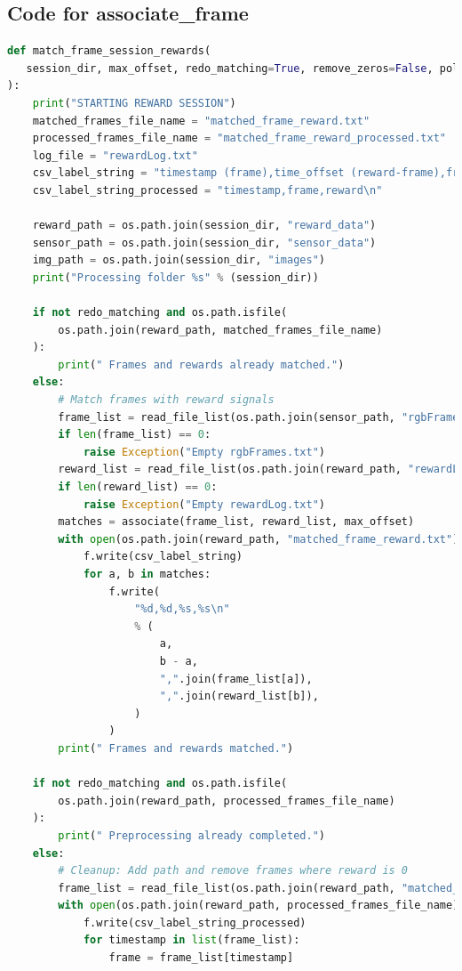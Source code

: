 \documentclass[12pt]{report}
\begin{document}
\subsection*{Code for associate\_frame}
\label{sub:associate}
\begin{lstlisting}[language=Python]
def match_frame_session_rewards(
   session_dir, max_offset, redo_matching=True, remove_zeros=False, policy="autopilot"
):
    print("STARTING REWARD SESSION")
    matched_frames_file_name = "matched_frame_reward.txt"
    processed_frames_file_name = "matched_frame_reward_processed.txt"
    log_file = "rewardLog.txt"
    csv_label_string = "timestamp (frame),time_offset (reward-frame),frame,reward\n"
    csv_label_string_processed = "timestamp,frame,reward\n"

    reward_path = os.path.join(session_dir, "reward_data")
    sensor_path = os.path.join(session_dir, "sensor_data")
    img_path = os.path.join(session_dir, "images")
    print("Processing folder %s" % (session_dir))

    if not redo_matching and os.path.isfile(
        os.path.join(reward_path, matched_frames_file_name)
    ):
        print(" Frames and rewards already matched.")
    else:
        # Match frames with reward signals
        frame_list = read_file_list(os.path.join(sensor_path, "rgbFrames.txt"))
        if len(frame_list) == 0:
            raise Exception("Empty rgbFrames.txt")
        reward_list = read_file_list(os.path.join(reward_path, "rewardLog.txt"))
        if len(reward_list) == 0:
            raise Exception("Empty rewardLog.txt")
        matches = associate(frame_list, reward_list, max_offset)
        with open(os.path.join(reward_path, "matched_frame_reward.txt"), "w") as f:
            f.write(csv_label_string)
            for a, b in matches:
                f.write(
                    "%d,%d,%s,%s\n"
                    % (
                        a,
                        b - a,
                        ",".join(frame_list[a]),
                        ",".join(reward_list[b]),
                    )
                )
        print(" Frames and rewards matched.")

    if not redo_matching and os.path.isfile(
        os.path.join(reward_path, processed_frames_file_name)
    ):
        print(" Preprocessing already completed.")
    else:
        # Cleanup: Add path and remove frames where reward is 0
        frame_list = read_file_list(os.path.join(reward_path, "matched_frame_reward.txt"))
        with open(os.path.join(reward_path, processed_frames_file_name), "w") as f:
            f.write(csv_label_string_processed)
            for timestamp in list(frame_list):
                frame = frame_list[timestamp]
            

\end{lstlisting}
\end{document}
